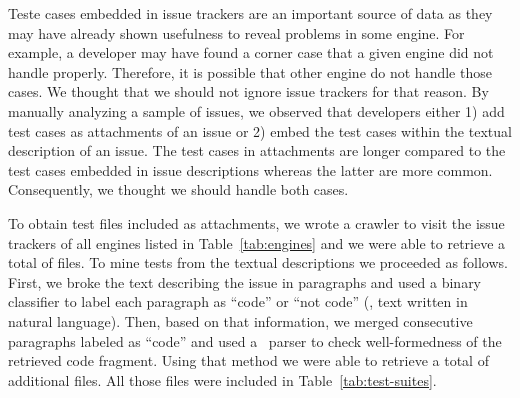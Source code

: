 \documentclass[smallextended]{svjour3}
\begin{document}




Teste cases embedded in issue trackers are an important source of data
as they may have already shown usefulness to reveal problems in some
engine. For example, a developer may have found a corner case that a
given engine did not handle properly. Therefore, it is possible that
other engine do not handle those cases. We thought that we should not
ignore issue trackers for that reason. By manually analyzing a sample
of issues, we observed that developers either 1) add test cases as
attachments of an issue or 2) embed the test cases within the textual
description of an issue. The test cases in attachments are longer
compared to the test cases embedded in issue descriptions whereas the
latter are more common. Consequently, we thought we should handle both
cases.

To obtain test files included as attachments, we wrote a crawler to
visit the issue trackers of all engines listed in
Table~\ref{tab:engines} and we were able to retrieve a total of
\filesAttached{} files.  To mine tests from the textual descriptions we
proceeded as follows. First, we broke the text describing the issue in
paragraphs and used a binary classifier to label each paragraph as
``code'' or ``not code'' (\ie{}, text written in natural language). Then, based on
that information, we merged consecutive paragraphs labeled as ``code''
and used a \js\ parser to check well-formedness of the retrieved code
fragment. Using that method we were able to retrieve a total of
\filesMining{} additional files. All those files were included in
Table~\ref{tab:test-suites}.
\end{document}
